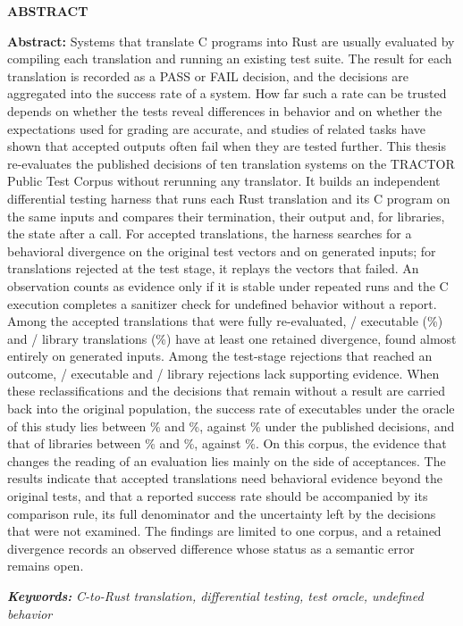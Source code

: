 \thispagestyle{plain}
\begin{center}
{\fontsize{13}{16}\selectfont\bfseries ABSTRACT}
\end{center}
\vspace{1em}

\begingroup
\fontsize{12}{15}\selectfont
\noindent\textbf{Abstract:}
Systems that translate C programs into Rust are usually evaluated by compiling each translation and running an existing test suite. The result for each translation is recorded as a PASS or FAIL decision, and the decisions are aggregated into the success rate of a system. How far such a rate can be trusted depends on whether the tests reveal differences in behavior and on whether the expectations used for grading are accurate, and studies of related tasks have shown that accepted outputs often fail when they are tested further. This thesis re-evaluates the published decisions of ten translation systems on the TRACTOR Public Test Corpus without rerunning any translator. It builds an independent differential testing harness that runs each Rust translation and its C program on the same inputs and compares their termination, their output and, for libraries, the state after a call. For accepted translations, the harness searches for a behavioral divergence on the original test vectors and on generated inputs; for translations rejected at the test stage, it replays the vectors that failed. An observation counts as evidence only if it is stable under repeated runs and the C execution completes a sanitizer check for undefined behavior without a report. Among the accepted translations that were fully re-evaluated, \rqFPExeAllNum/\rqFPExeAllDen{} executable (\rqFPExeAllPct\%) and \rqFPLibAllNum/\rqFPLibAllDen{} library translations (\rqFPLibAllPct\%) have at least one retained divergence, found almost entirely on generated inputs. Among the test-stage rejections that reached an outcome, \rqFFExeAllNum/\rqFFExeAllDen{} executable and \rqFFLibAllNum/\rqFFLibAllDen{} library rejections lack supporting evidence. When these reclassifications and the decisions that remain without a result are carried back into the original population, the success rate of executables under the oracle of this study lies between \rqSRLoExeAllPct\% and \rqSRUpExeAllPct\%, against \rqSRExeAllPct\% under the published decisions, and that of libraries between \rqSRLoLibAllPct\% and \rqSRUpLibAllPct\%, against \rqSRLibAllPct\%. On this corpus, the evidence that changes the reading of an evaluation lies mainly on the side of acceptances. The results indicate that accepted translations need behavioral evidence beyond the original tests, and that a reported success rate should be accompanied by its comparison rule, its full denominator and the uncertainty left by the decisions that were not examined. The findings are limited to one corpus, and a retained divergence records an observed difference whose status as a semantic error remains open.

\vspace{1em}
\noindent\textit{\textbf{Keywords:}} \textit{C-to-Rust translation, differential testing, test oracle, undefined behavior}
\endgroup
\clearpage
